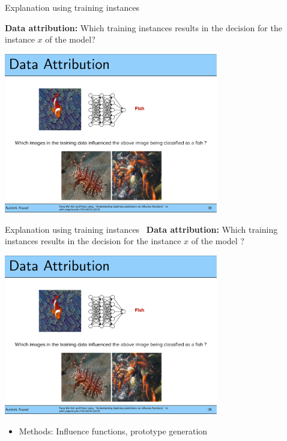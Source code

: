 \documentclass[11pt,compress,t,notes=noshow, aspectratio=169, xcolor=table]{beamer}
\begin{document}
\begin{frame}{Explanation using training instances~}

	\textbf{Data attribution:} Which training instances results in the decision for the instance $x$ of the model?
	\begin{center}
		\includegraphics[page=1, width=0.7\textwidth]{figure/fish-attribution.pdf}
	\end{center}
\end{frame}

\begin{frame}{Explanation using training instances~}
	\textbf{Data attribution:} Which training instances results in the decision for the instance $x$ of the model ?
	\begin{center}
		\includegraphics[page=1, width=0.7\textwidth]{figure/prototypes-fish.pdf}
	\end{center}
	\begin{itemize}
		\item Methods:
		Influence functions, prototype generation
	\end{itemize}
\end{frame}
\end{document}
